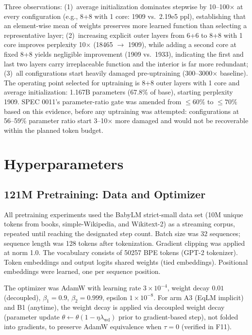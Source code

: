 Three observations: (1)~average initialization dominates stepwise by 10--100$\times$ at every configuration (e.g., 8+8 with 1 core: 1909 vs.\ 2.19e5 ppl), establishing that an element-wise mean of weights preserves more learned function than selecting a representative layer; (2)~increasing explicit outer layers from 6+6 to 8+8 with 1 core improves perplexity 10$\times$ (18465 $\to$ 1909), while adding a second core at fixed 8+8 yields negligible improvement (1909 vs.\ 1933), indicating the first and last two layers carry irreplaceable function and the interior is far more redundant; (3)~all configurations start heavily damaged pre-uptraining (300--3000$\times$ baseline). The operating point selected for uptraining is 8+8 outer layers with 1 core and average initialization: 1.167B parameters (67.8\% of base), starting perplexity 1909. SPEC 0011's parameter-ratio gate was amended from $\leq 60\%$ to $\leq 70\%$ based on this evidence, before any uptraining was attempted: configurations at 56--59\% parameter ratio start 3--10$\times$ more damaged and would not be recoverable within the planned token budget.

\section{Hyperparameters}

\subsection{121M Pretraining: Data and Optimizer}

All pretraining experiments used the BabyLM strict-small data set (10M unique tokens from books, simple-Wikipedia, and Wikitext-2) as a streaming corpus, repeated until reaching the designated step count. Batch size was 32 sequences; sequence length was 128 tokens after tokenization. Gradient clipping was applied at norm 1.0. The vocabulary consists of 50257 BPE tokens (GPT-2 tokenizer). Token embeddings and output logits shared weights (tied embeddings). Positional embeddings were learned, one per sequence position.

The optimizer was AdamW with learning rate $3 \times 10^{-4}$, weight decay $0.01$ (decoupled), $\beta_1 = 0.9$, $\beta_2 = 0.999$, epsilon $1 \times 10^{-8}$. For arm A3 (EqLM implicit) and B1 (anytime), the weight decay is applied via decoupled weight decay (parameter update $\theta \leftarrow \theta(1 - \eta \lambda_{\text{wd}})$ prior to gradient-based step), not folded into gradients, to preserve AdamW equivalence when $\tau = 0$ (verified in F11).

